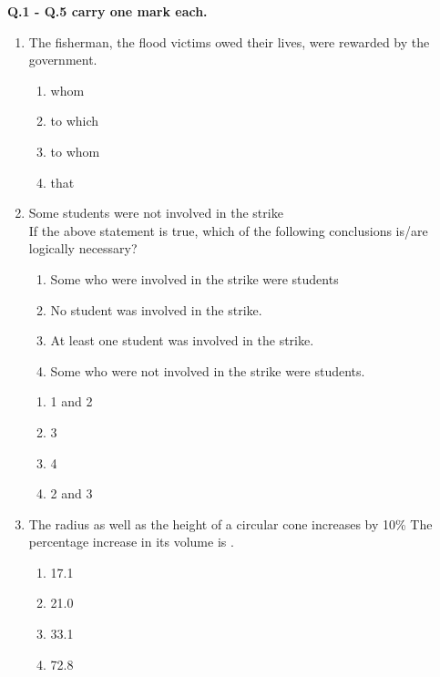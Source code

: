 \documentclass[12pt]{article}
\begin{document}
\noindent\textbf{Q.1 - Q.5 carry one mark each.}\hfill
\begin{enumerate}[label = Q.\arabic*]
	\item The fisherman, \underline{\hspace{2cm}} the flood victims owed their lives, were rewarded by the government.
		\begin{multicols}{4}
			\begin{enumerate}[label=(\Alph*)]
				\item whom
				\item to which
				\item to whom
				\item that
			\end{enumerate}
		\end{multicols}
	\item Some students were not involved in the strike \\[1em]
		If the above statement is true, which of the following conclusions is/are logically necessary?
		\begin{enumerate}[label=\arabic*.]
			\item Some who were involved in the strike were students 
			\item No student was involved in the strike.
			\item At least one student was involved in the strike.
			\item Some who were not involved in the strike were students.
		\end{enumerate}
		\begin{multicols}{4}
			\begin{enumerate}[label=(\Alph*)]
				\item 1 and 2 \item 3 \item 4 \item 2 and 3
			\end{enumerate}
		\end{multicols}
	\item The radius as well as the height of a circular cone increases by 10\% The percentage increase in its volume is \underline{\hspace{2cm}}.
		\begin{multicols}{4}
			\begin{enumerate}[label=(\Alph*)]
				\item 17.1
				\item 21.0
				\item 33.1
				\item 72.8

\end{enumerate}
\end{multicols}
\end{enumerate}
\end{document}
